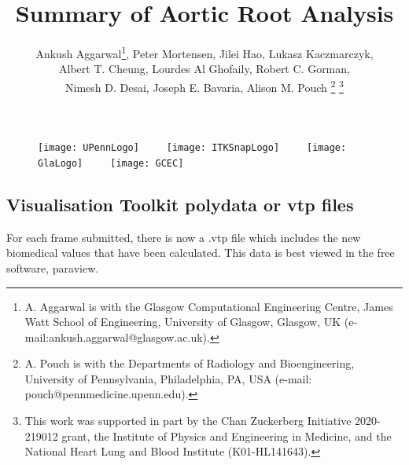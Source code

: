 \documentclass{article}
\title{Summary of Aortic Root Analysis}
\author{Ankush Aggarwal\thanks{A. Aggarwal is with the
Glasgow Computational Engineering Centre, James Watt School of Engineering, University of Glasgow, Glasgow, UK (e-mail:ankush.aggarwal@glasgow.ac.uk). }, Peter Mortensen, Jilei Hao, Lukasz Kaczmarczyk, \\ 
Albert T. Cheung, Lourdes Al Ghofaily, Robert C. Gorman, \\Nimesh D. Desai, Joseph E. Bavaria, Alison M. Pouch \thanks{A. Pouch is with the Departments of Radiology and Bioengineering, University of Pennsylvania, Philadelphia, PA, USA (e-mail: pouch@pennmedicine.upenn.edu).}
%
\thanks{This work was supported in part by the Chan Zuckerberg Initiative 2020-219012 grant, the Institute of Physics and Engineering in Medicine, and the National Heart Lung and Blood Institute (K01-HL141643).}
}
\begin{document}
\maketitle
\begin{figure}[h!]
\texttt{[image: UPennLogo]}~~~~~\texttt{[image: ITKSnapLogo]}~~~~~\texttt{[image: GlaLogo]}~~~~~\texttt{[image: GCEC]}
\end{figure}
\newpage
\subsection*{Visualisation Toolkit polydata or vtp files}
For each frame submitted, there is now a .vtp file which includes the new biomedical values that have been calculated. This data is best viewed in the free software, paraview. 
\end{document}

